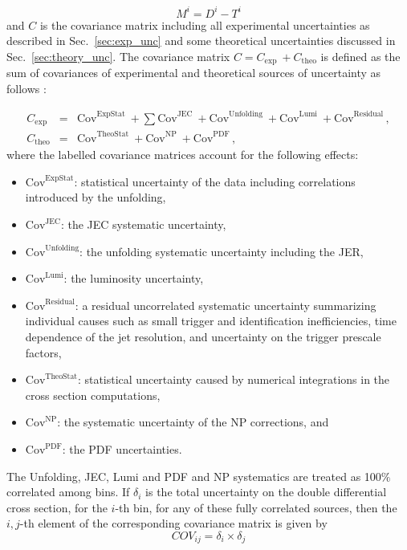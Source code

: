 \begin{equation}
 \label{eqn:M_matrix}
 M^{i}=D^{i}-T^{i}
\end{equation}
and $C$ is the covariance matrix including all experimental uncertainties as described in Sec.~\ref{sec:exp_unc} and some theoretical uncertainties discussed in Sec.~\ref{sec:theory_unc}. The covariance matrix $C=C_\mathrm{exp}~\plus C_\mathrm{theo}$ is defined as the sum of covariances of experimental and theoretical sources of uncertainty as follows : 

\begin{eqnarray}
  \label{eqn:c_exp}
  C_\mathrm{exp} &=& \mathrm{Cov}^\mathrm{ExpStat}~\plus \sum\mathrm{Cov}^\mathrm{JEC}~\plus \mathrm{Cov}^\mathrm{Unfolding}~\plus \mathrm{Cov}^\mathrm{Lumi}~\plus \mathrm{Cov}^\mathrm{Residual}\,,\\
  C_\mathrm{theo} &=& \mathrm{Cov}^\mathrm{TheoStat}~\plus \mathrm{Cov}^\mathrm{NP}~\plus \mathrm{Cov}^\mathrm{PDF}\,,
  \label{eqn:c_theo}
\end{eqnarray}
where the labelled covariance matrices account for the following effects:

\begin{itemize}
\item{$\mathrm{Cov}^\mathrm{ExpStat}$: statistical uncertainty of the data including correlations introduced by the unfolding,}
\item{$\mathrm{Cov}^\mathrm{JEC}$: the JEC systematic uncertainty,}
\item{$\mathrm{Cov}^\mathrm{Unfolding}$: the unfolding systematic uncertainty including the JER,}
\item{$\mathrm{Cov}^\mathrm{Lumi}$: the luminosity uncertainty,}
\item{$\mathrm{Cov}^\mathrm{Residual}$: a residual uncorrelated systematic uncertainty summarizing individual causes such as small trigger and identification inefficiencies, time dependence of the jet \pt resolution, and uncertainty on the trigger prescale factors,}
\item{$\mathrm{Cov}^\mathrm{TheoStat}$: statistical uncertainty caused by numerical integrations in the cross section computations,}
\item{$\mathrm{Cov}^\mathrm{NP}$: the systematic uncertainty of the NP corrections, and}
\item{$\mathrm{Cov}^\mathrm{PDF}$: the PDF uncertainties.}
\end{itemize}

The Unfolding, JEC, Lumi and PDF and NP systematics are treated as 100$\%$ correlated among \httwo bins. If $\delta_i$ is the
total uncertainty on the double differential cross section, for the $i$-th \httwo bin, for any of these fully correlated sources, then the
$i,j$-th element of the corresponding covariance matrix is given by
\begin{equation*}
 COV_{ij} = \delta_i \times \delta_j
\end{equation*}

